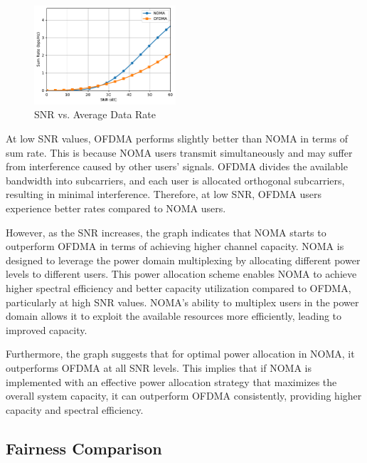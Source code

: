 \documentclass[conference]{IEEEtran}
\begin{document}
\begin{figure}[t!]
    \centering
    \includegraphics[width=0.47\textwidth , height= 0.35\textwidth]{figures/noma_vs_ofdma.pdf}
    \caption{SNR vs. Average Data Rate}
\end{figure}

At low SNR values, OFDMA performs slightly better than NOMA in terms of sum rate. This is because NOMA users transmit simultaneously and may suffer from interference caused by other users' signals. OFDMA divides the available bandwidth into subcarriers, and each user is allocated orthogonal subcarriers, resulting in minimal interference. Therefore, at low SNR, OFDMA users experience better rates compared to NOMA users.

However, as the SNR increases, the graph indicates that NOMA starts to outperform OFDMA in terms of achieving higher channel capacity. NOMA is designed to leverage the power domain multiplexing by allocating different power levels to different users. This power allocation scheme enables NOMA to achieve higher spectral efficiency and better capacity utilization compared to OFDMA, particularly at high SNR values. NOMA's ability to multiplex users in the power domain allows it to exploit the available resources more efficiently, leading to improved capacity.

Furthermore, the graph suggests that for optimal power allocation in NOMA, it outperforms OFDMA at all SNR levels. This implies that if NOMA is implemented with an effective power allocation strategy that maximizes the overall system capacity, it can outperform OFDMA consistently, providing higher capacity and spectral efficiency.

\subsection{Fairness Comparison}
\end{document}
